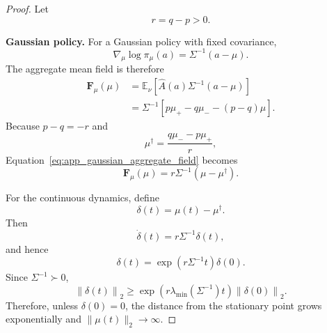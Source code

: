 \documentclass{article}
\theoremstyle{plain}
\theoremstyle{definition}
\theoremstyle{remark}
\begin{document}
\begin{proof}
Let
\begin{equation}
    r
    =
    q-p
    >
    0.
\end{equation}

\medskip
\noindent\textbf{Gaussian policy.}
For a Gaussian policy with fixed covariance,
\begin{equation}
    \nabla_{\mu}
    \log\pi_{\mu}(a)
    =
    \Sigma^{-1}(a-\mu).
    \label{eq:app_gaussian_mean_score}
\end{equation}
The aggregate mean field is therefore
\begin{equation}
\begin{aligned}
    \mathbf{F}_{\mu}(\mu)
    &=
    \mathbb{E}_{\nu}
    \left[
        \widehat{A}(a)
        \Sigma^{-1}(a-\mu)
    \right] \\
    &=
    \Sigma^{-1}
    \left[
        p\mu_{+}
        -
        q\mu_{-}
        -
        (p-q)\mu
    \right].
\end{aligned}
\label{eq:app_gaussian_aggregate_field}
\end{equation}
Because $p-q=-r$ and
\begin{equation}
    \mu^{\dagger}
    =
    \frac{
        q\mu_{-}
        -
        p\mu_{+}
    }{
        r
    },
\end{equation}
Equation~\eqref{eq:app_gaussian_aggregate_field} becomes
\begin{equation}
    \mathbf{F}_{\mu}(\mu)
    =
    r\Sigma^{-1}
    \left(
        \mu-\mu^{\dagger}
    \right).
\end{equation}

For the continuous dynamics, define
\begin{equation}
    \delta(t)
    =
    \mu(t)-\mu^{\dagger}.
\end{equation}
Then
\begin{equation}
    \dot{\delta}(t)
    =
    r\Sigma^{-1}\delta(t),
\end{equation}
and hence
\begin{equation}
    \delta(t)
    =
    \exp
    \left(
        r\Sigma^{-1}t
    \right)
    \delta(0).
    \label{eq:app_gaussian_continuous_solution}
\end{equation}
Since $\Sigma^{-1}\succ0$,
\begin{equation}
    \left\|
        \delta(t)
    \right\|_2
    \geq
    \exp
    \left(
        r\lambda_{\min}
        \left(
            \Sigma^{-1}
        \right)t
    \right)
    \left\|
        \delta(0)
    \right\|_2.
    \label{eq:app_gaussian_continuous_growth}
\end{equation}
Therefore, unless
$\delta(0)=0$, the distance from the stationary point grows
exponentially and
$\|\mu(t)\|_2\rightarrow\infty$.


\end{proof}
\end{document}
